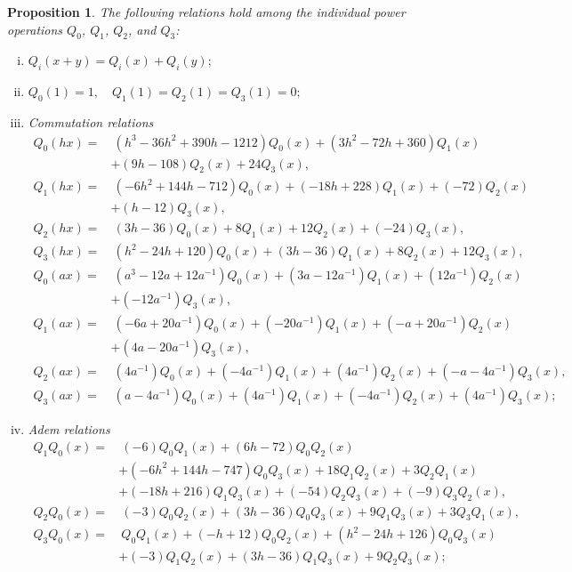 \documentclass{gtpart}
\newtheorem{prop}[thm]{Proposition}
\theoremstyle{definition}
\theoremstyle{remark}
\begin{document}
\begin{prop}
\label{prop:Q}
 The following relations hold among the individual power operations $Q_0$, $Q_1$, $Q_2$, and $Q_3$: 
 \begin{enumerate}[(i)]
  \item $Q_i(x+y) = Q_i(x) + Q_i(y);$ 

  \item $Q_0(1) = 1, \quad Q_1(1) = Q_2(1) = Q_3(1) = 0;$ 

  \item {\em Commutation relations} 
  \begin{equation*}
  \begin{split}
   Q_0(h x) = & ~ (h^3 - 36 h^2 + 390 h - 1212) Q_0(x) + (3 h^2 - 72 h + 360) Q_1(x) \qquad \qquad \\
              & + (9 h - 108) Q_2(x) + 24 Q_3(x), \\
   Q_1(h x) = & ~ (-6 h^2 + 144 h - 712) Q_0(x) + (-18 h + 228) Q_1(x) + (-72) Q_2(x) \\
              & + (h - 12) Q_3(x), \\
   Q_2(h x) = & ~ (3 h - 36) Q_0(x) + 8 Q_1(x) + 12 Q_2(x) + (-24) Q_3(x), \\
   Q_3(h x) = & ~ (h^2 - 24 h + 120) Q_0(x) + (3 h - 36) Q_1(x) + 8 Q_2(x) + 12 Q_3(x), \\
   Q_0(a x) = & ~ (a^3 - 12 a + 12 a^{-1}) Q_0(x) + (3 a - 12 a^{-1}) Q_1(x) + (12 a^{-1}) Q_2(x) \\
              & + (-12 a^{-1}) Q_3(x), \\
   Q_1(a x) = & ~ (-6 a + 20 a^{-1}) Q_0(x) + (-20 a^{-1}) Q_1(x) + (- a + 20 a^{-1}) Q_2(x) \\
              & + (4 a - 20 a^{-1}) Q_3(x), \\
   Q_2(a x) = & ~ (4 a^{-1}) Q_0(x) + (-4 a^{-1}) Q_1(x) + (4 a^{-1}) Q_2(x) + (- a - 4 a^{-1}) Q_3(x), \\
   Q_3(a x) = & ~ (a - 4 a^{-1}) Q_0(x) + (4 a^{-1}) Q_1(x) + (-4 a^{-1}) Q_2(x) + (4 a^{-1}) Q_3(x); 
  \end{split}
  \end{equation*}

  \item {\em Adem relations} 
  \begin{equation*}
  \begin{split}
   Q_1Q_0(x) = & ~ (-6) Q_0Q_1(x) + (6 h - 72) Q_0Q_2(x) \\
               & + (-6 h^2 + 144 h - 747) Q_0Q_3(x) + 18 Q_1Q_2(x) + 3 Q_2Q_1(x) \\
               & + (-18 h + 216) Q_1Q_3(x) + (-54) Q_2Q_3(x) + (-9) Q_3Q_2(x), \\
   Q_2Q_0(x) = & ~ (-3) Q_0Q_2(x) + (3 h - 36) Q_0Q_3(x) + 9 Q_1Q_3(x) + 3 Q_3Q_1(x), \qquad \qquad \\
   Q_3Q_0(x) = & ~ Q_0Q_1(x) + (-h + 12) Q_0Q_2(x) + (h^2 - 24 h + 126) Q_0Q_3(x) \\
               & + (-3) Q_1Q_2(x) + (3 h - 36) Q_1Q_3(x) + 9 Q_2Q_3(x); 
  \end{split}
  \end{equation*}


\end{enumerate}
\end{prop}
\end{document}
